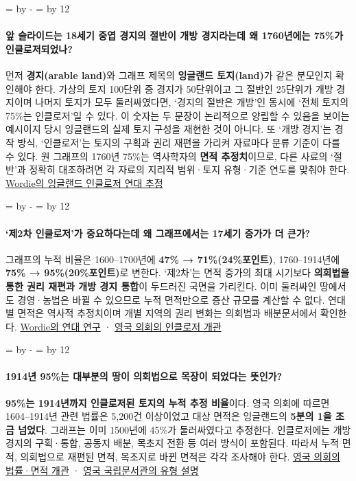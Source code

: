 \documentclass[10pt,a4paper]{article}
\newcommand{\ReserveQuestionSpace}{%
  \par\begingroup
  \dimen0=\pagegoal \advance\dimen0 by -\pagetotal
  \dimen2=\baselineskip \multiply\dimen2 by 12
  \ifdim\dimen0<\dimen2 \newpage\fi
  \endgroup}
\begin{document}
\ReserveQuestionSpace
\paragraph{앞 슬라이드는 18세기 중엽 경지의 절반이 개방 경지라는데 왜 1760년에는 75\%가 인클로저되었나?}
먼저 \textbf{경지(arable land)}와 그래프 제목의 \textbf{잉글랜드 토지(land)}가 같은 분모인지 확인해야 한다. 가상의 토지 100단위 중 경지가 50단위이고 그 절반인 25단위가 개방 경지이며 나머지 토지가 모두 둘러싸였다면, ‘경지의 절반은 개방’인 동시에 ‘전체 토지의 75\%는 인클로저’일 수 있다. 이 숫자는 두 문장이 논리적으로 양립할 수 있음을 보이는 예시이지 당시 잉글랜드의 실제 토지 구성을 재현한 것이 아니다. 또 ‘개방 경지’는 경작 방식, ‘인클로저’는 토지의 구획과 권리 재편을 가리켜 자료마다 분류 기준이 다를 수 있다. 원 그래프의 1760년 75\%는 역사학자의 \textbf{면적 추정치}이므로, 다른 사료의 ‘절반’과 정확히 대조하려면 각 자료의 지리적 범위·토지 유형·기준 연도를 맞춰야 한다. \href{https://www.jstor.org/stable/2597236}{Wordie의 잉글랜드 인클로저 연대 추정}\par

\ReserveQuestionSpace
\paragraph{‘제2차 인클로저’가 중요하다는데 왜 그래프에서는 17세기 증가가 더 큰가?}
그래프의 누적 비율은 1600–1700년에 \textbf{47\% → 71\%(24\%포인트)}, 1760–1914년에 \textbf{75\% → 95\%(20\%포인트)}로 변한다. ‘제2차’는 면적 증가의 최대 시기보다 \textbf{의회법을 통한 권리 재편과 개방 경지 통합}이 두드러진 국면을 가리킨다. 이미 둘러싸인 땅에서도 경영·농법은 바뀔 수 있으므로 누적 면적만으로 증산 규모를 계산할 수 없다. 연대별 면적은 역사적 추정치이며 개별 지역의 권리 변화는 의회법과 배분문서에서 확인한다. \href{https://www.jstor.org/stable/2597236}{Wordie의 연대 연구} · \href{https://www.parliament.uk/about/living-heritage/transformingsociety/towncountry/landscape/overview/enclosingland/}{영국 의회의 인클로저 개관}\par

\ReserveQuestionSpace
\paragraph{1914년 95\%는 대부분의 땅이 의회법으로 목장이 되었다는 뜻인가?}
\textbf{95\%는 1914년까지 인클로저된 토지의 누적 추정 비율}이다. 영국 의회에 따르면 1604–1914년 관련 법률은 5,200건 이상이었고 대상 면적은 잉글랜드의 \textbf{5분의 1을 조금 넘었다}. 그래프는 이미 1500년에 45\%가 둘러싸였다고 추정한다. 인클로저에는 개방 경지의 구획·통합, 공동지 배분, 목초지 전환 등 여러 방식이 포함된다. 따라서 누적 면적, 의회법으로 재편된 면적, 목초지로 바뀐 면적은 각각 조사해야 한다. \href{https://www.parliament.uk/about/living-heritage/transformingsociety/towncountry/landscape/overview/enclosingland/}{영국 의회의 법률·면적 개관} · \href{https://www.nationalarchives.gov.uk/help-with-your-research/research-guides/enclosure-awards}{영국 국립문서관의 유형 설명}\par
\end{document}
